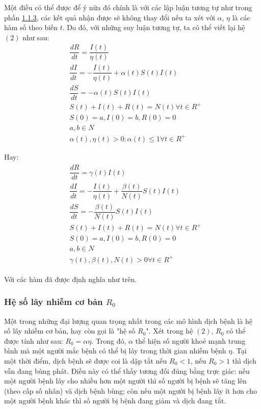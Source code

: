 \documentclass[a4paper]{article}
\begin{document}
Một điều có thể được để ý nữa đó chính là với các lập luận tương tự như trong phần \hyperref[sec: continuous SIR]{1.1.3}, các kết quả nhận được sẽ không thay đổi nếu ta xét với $\alpha$, $\eta$ là các hàm số theo biến $t$. Do đó, với những suy luận tương tự, ta có thể viết lại hệ \hyperref[equations: 2]{$(2)$} như sau:
\begin{align*}
    & \dfrac{dR}{dt} = \dfrac{I(t)}{\eta(t)} \\
    & \dfrac{dI}{dt} = - \dfrac{I(t)}{\eta(t)} +  \alpha(t)S(t)I(t) \\
    & \dfrac{dS}{dt} = -\alpha(t)S(t)I(t) \\
    & S(t) + I(t) + R(t) = N(t)  \forall t \in R^{+} \\
    & S(0)=a, I(0)=b, R(0)=0 \\
    & a, b \in N \\
    & \alpha(t), \eta(t) > 0; \alpha(t) \leq 1 \forall t \in R^{+} 
\end{align*}

Hay:
\begin{align}
    \begin{split}
        & \dfrac{dR}{dt} = \gamma(t)I(t) \\
        & \dfrac{dI}{dt} = - \dfrac{I(t)}{\eta(t)} +  \dfrac{\beta(t)}{N(t)}S(t)I(t) \\
        & \dfrac{dS}{dt} = -\dfrac{\beta(t)}{N(t)}S(t)I(t) \\
        & S(t) + I(t) + R(t) = N(t)  \forall t \in R^{+} \\
        & S(0)=a, I(0)=b, R(0)=0 \\
        & a, b \in N \\
        & \gamma(t), \beta(t), N(t) > 0 \forall t \in R^{+} 
    \end{split}
\end{align}

Với các hàm đã được định nghĩa như trên.
\subsubsection{Hệ số lây nhiễm cơ bản $R_0$}
Một trong những đại lượng quan trọng nhất trong các mô hình dịch bệnh là hệ số lây nhiễm cơ bản, hay còn gọi là "hệ số $R_0$". Xét trong hệ \hyperref[equations: 2]{$(2)$}, $R_0$ có thể được tính như sau: $R_0 = \alpha  \eta $. Trong đó, $\alpha $ thể hiện số người khoẻ mạnh trung bình mà một người mắc bệnh có thể bị lây trong thời gian nhiễm bệnh $\eta$. Tại một thời điểm, dịch bệnh sẽ được coi là dập tắt nếu $R_0 < 1$, nếu $R_0>1$ thì dịch 
vẫn đang bùng phát. Điều này có thể thấy tương đối đúng bằng trực giác: nếu một người bệnh lây cho nhiều hơn một người thì số người bị bệnh sẽ tăng lên (theo cấp số nhân) và dịch bệnh bùng; còn nếu một người bị bệnh lây ít hơn cho một người bệnh khác thì số người bị bệnh đang giảm và dịch đang tắt. 
\end{document}
